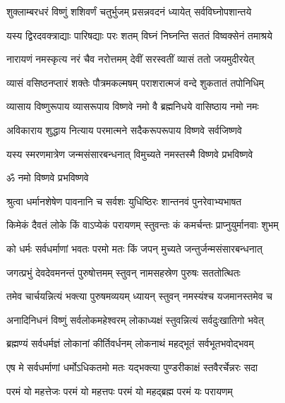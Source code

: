 
\twolineshloka
{शुक्लाम्बरधरं विष्णुं शशिवर्णं चतुर्भुजम्}
{प्रसन्नवदनं ध्यायेत् सर्वविघ्नोपशान्तये}

\twolineshloka
{यस्य द्विरदवक्त्राद्याः पारिषद्याः परः शतम्}
{विघ्नं निघ्नन्ति सततं विष्वक्सेनं तमाश्रये}

\twolineshloka
{नारायणं नमस्कृत्य नरं चैव नरोत्तमम्}
{देवीं सरस्वतीं व्यासं ततो जयमुदीरयेत्}

\twolineshloka
{व्यासं वसिष्ठनप्तारं शक्तेः पौत्रमकल्मषम्}
{पराशरात्मजं वन्दे शुकतातं तपोनिधिम्}

\twolineshloka
{व्यासाय विष्णुरूपाय व्यासरूपाय विष्णवे}
{नमो वै ब्रह्मनिधये वासिष्ठाय नमो नमः}

\twolineshloka
{अविकाराय शुद्धाय नित्याय परमात्मने}
{सदैकरूपरूपाय विष्णवे सर्वजिष्णवे}

\twolineshloka
{यस्य स्मरणमात्रेण जन्मसंसारबन्धनात्}
{विमुच्यते नमस्तस्मै विष्णवे प्रभविष्णवे}

\centerline{ॐ नमो विष्णवे प्रभविष्णवे}

\twolineshloka
{श्रुत्वा धर्मानशेषेण पावनानि च सर्वशः}
{युधिष्ठिरः शान्तनवं पुनरेवाभ्यभाषत}

\twolineshloka
{किमेकं दैवतं लोके किं वाऽप्येकं परायणम्}
{स्तुवन्तः कं कमर्चन्तः प्राप्नुयुर्मानवाः शुभम्}

\twolineshloka
{को धर्मः सर्वधर्माणां भवतः परमो मतः}
{किं जपन् मुच्यते जन्तुर्जन्मसंसारबन्धनात्}

\twolineshloka
{जगत्प्रभुं देवदेवमनन्तं पुरुषोत्तमम्}
{स्तुवन् नामसहस्रेण पुरुषः सततोत्थितः}

\twolineshloka
{तमेव चार्चयन्नित्यं भक्त्या पुरुषमव्ययम्}
{ध्यायन् स्तुवन् नमस्यंश्च यजमानस्तमेव च}

\twolineshloka
{अनादिनिधनं विष्णुं सर्वलोकमहेश्वरम्}
{लोकाध्यक्षं स्तुवन्नित्यं सर्वदुःखातिगो भवेत्}

\twolineshloka
{ब्रह्मण्यं सर्वधर्मज्ञं लोकानां कीर्तिवर्धनम्}
{लोकनाथं महद्भूतं सर्वभूतभवोद्भवम्}

\twolineshloka
{एष मे सर्वधर्माणां धर्मोऽधिकतमो मतः}
{यद्भक्त्या पुण्डरीकाक्षं स्तवैरर्चेन्नरः सदा}

\twolineshloka
{परमं यो महत्तेजः परमं यो महत्तपः}
{परमं यो महद्ब्रह्म परमं यः परायणम्}

